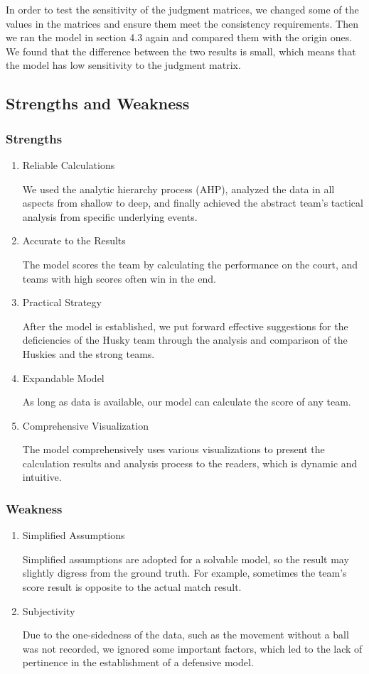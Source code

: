\documentclass{mcmthesis}
\begin{document}
In order to test the sensitivity of the judgment matrices, we changed some of the values in the matrices and ensure them meet the consistency requirements. Then we ran the model in section 4.3 again and compared them with the origin ones. We found that the difference between the two results is small, which means that the model has low sensitivity to the judgment matrix.

\subsection{Strengths and Weakness}
\subsubsection{Strengths}
\begin{enumerate}
\item Reliable Calculations

\qquad We used the analytic hierarchy process (AHP), analyzed the data in all aspects from shallow to deep, and finally achieved the abstract team's tactical analysis from specific underlying events.
\item Accurate to the Results

\qquad The model scores the team by calculating the performance on the court, and teams with high scores often win in the end.
\item Practical Strategy

\qquad After the model is established, we put forward effective suggestions for the deficiencies of the Husky team through the analysis and comparison of the Huskies and the strong teams.
\item Expandable Model

\qquad As long as data is available, our model can calculate the score of any
team.
\item Comprehensive Visualization

\qquad The model comprehensively uses various visualizations to present the calculation results and analysis process to the readers, which is dynamic and intuitive.
\end{enumerate}
\subsubsection{Weakness}
\begin{enumerate}
\item Simplified Assumptions

\qquad Simplified assumptions are adopted for a solvable model, so the
result may slightly digress from the ground truth. For example, sometimes the team's score result is opposite to the actual match result.
\item Subjectivity

\qquad Due to the one-sidedness of the data, such as the movement without a ball was not recorded, we ignored some important factors, which led to the lack of pertinence in the establishment of a defensive model.
\end{enumerate}
\end{document}
